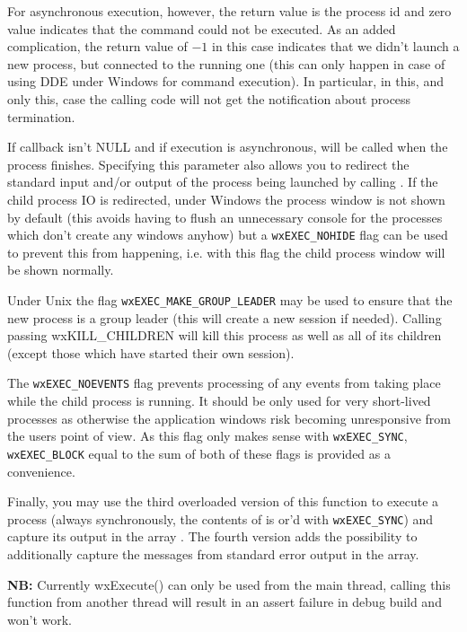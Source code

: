 For asynchronous execution, however, the return value is the process id and
zero value indicates that the command could not be executed. As an added
complication, the return value of $-1$ in this case indicates that we didn't
launch a new process, but connected to the running one (this can only happen in
case of using DDE under Windows for command execution). In particular, in this,
and only this, case the calling code will not get the notification about
process termination.

If callback isn't NULL and if execution is asynchronous,
 will be called when
the process finishes. Specifying this parameter also allows you to redirect the
standard input and/or output of the process being launched by calling
. If the child process IO is redirected,
under Windows the process window is not shown by default (this avoids having to
flush an unnecessary console for the processes which don't create any windows
anyhow) but a {\tt wxEXEC\_NOHIDE} flag can be used to prevent this from
happening, i.e. with this flag the child process window will be shown normally.

Under Unix the flag {\tt wxEXEC\_MAKE\_GROUP\_LEADER} may be used to ensure
that the new process is a group leader (this will create a new session if
needed). Calling  passing wxKILL\_CHILDREN will
kill this process as well as all of its children (except those which have
started their own session).

The {\tt wxEXEC\_NOEVENTS} flag prevents processing of any events from taking
place while the child process is running. It should be only used for very
short-lived processes as otherwise the application windows risk becoming
unresponsive from the users point of view. As this flag only makes sense with
{\tt wxEXEC\_SYNC}, {\tt wxEXEC\_BLOCK} equal to the sum of both of these flags
is provided as a convenience.

Finally, you may use the third overloaded version of this function to execute
a process (always synchronously, the contents of  is or'd with
\texttt{wxEXEC\_SYNC}) and capture its output in the array . The
fourth version adds the possibility to additionally capture the messages from
standard error output in the  array.

{\bf NB:} Currently wxExecute() can only be used from the main thread, calling
this function from another thread will result in an assert failure in debug
build and won't work.

